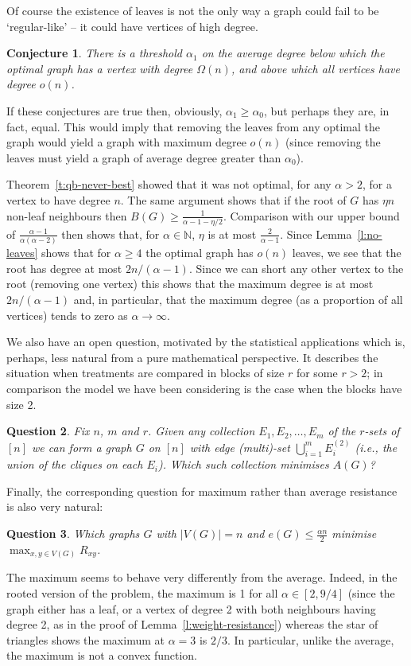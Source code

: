 \documentclass[11pt]{article}
\newtheorem{conj}{Conjecture}
\newtheorem{question}[conj]{Question}
\theoremstyle{remark}
\def\a{\alpha}
\def\N{\mathbb{N}}
\begin{document}
Of course the existence of leaves is not the only way a graph could
fail to be `regular-like' -- it could have vertices of high degree.
\begin{conj}
  There is a threshold $\a_1$ on the average degree below which the
  optimal graph has a vertex with degree $\Omega(n)$, and above which
  all vertices have degree $o(n)$.
\end{conj}
If these conjectures are true then, obviously, $\a_1\ge \a_0$, but
perhaps they are, in fact, equal. This would imply that removing the
leaves from any optimal the graph would yield a graph with maximum
degree $o(n)$ (since removing the leaves must yield a graph of average
degree greater than $\alpha_0$).

Theorem~\ref{t:qb-never-best} showed that it was not optimal, for any
$\a>2$, for a vertex to have degree $n$. The same argument shows that
if the root of $G$ has $\eta n$ non-leaf neighbours then $B(G)\ge
\frac{1}{\a-1-\eta/2}$. Comparison with our upper bound of
$\frac{\a-1}{\a(\a-2)}$ then shows that, for $\alpha\in \N$, $\eta$ is
at most $\frac{2}{\a-1}$. Since Lemma~\ref{l:no-leaves} shows that for
$\a\ge 4$ the optimal graph has $o(n)$ leaves, we see that the root
has degree at most $2n/(\a-1)$. Since we can short any other vertex to
the root (removing one vertex) this shows that the maximum degree is
at most $2n/(\a-1)$ and, in particular, that the maximum degree (as a
proportion of all vertices) tends to zero as $\a\to \infty$.

We also have an open question, motivated by the statistical
applications which is, perhaps, less natural from a pure mathematical
perspective. It describes the situation when treatments are compared
in blocks of size $r$ for some $r>2$; in comparison the model we have
been considering is the case when the blocks have size 2.
\begin{question}
  Fix $n$, $m$ and $r$. Given any collection $E_1,E_2,\dots, E_m$ of
  the $r$-sets of $[n]$ we can form a graph $G$ on $[n]$ with
  edge (multi)-set $\bigcup_{i=1}^m E_i^{(2)}$ (i.e., the union of the
  cliques on each $E_i$). Which such collection minimises $A(G)$?
\end{question}

Finally, the corresponding question for maximum rather than average resistance is also very natural:
\begin{question}
  Which graphs $G$ with $|V(G)|=n$ and $e(G)\le \frac{\alpha n}{2}$ minimise
    $\max_{x,y\in V(G)}R_{xy}$.
\end{question}
The maximum seems to behave very differently from the average. Indeed,
in the rooted version of the problem, the maximum is 1 for all
$\alpha\in [2,9/4]$ (since the graph either has a leaf, or a vertex of
degree 2 with both neighbours having degree 2, as in the proof of
Lemma~\ref{l:weight-resistance}) whereas the star of triangles shows
the maximum at $\alpha=3$ is $2/3$. In particular, unlike the average,
the maximum is not a convex function.
\end{document}
